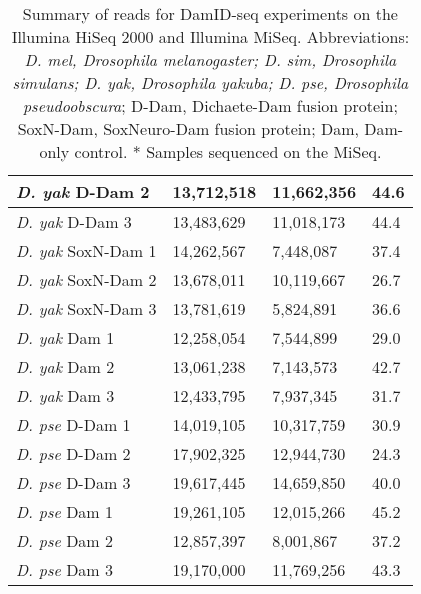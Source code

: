 \begin{table}[!h]
\begin{tabular}{|l|l|l|l|}
\emph{D. yak} D-Dam 2     & 13,712,518  & 11,662,356   & 44.6               \\ \hline
\emph{D. yak} D-Dam 3     & 13,483,629  & 11,018,173   & 44.4               \\ \hline
\emph{D. yak} SoxN-Dam 1  & 14,262,567  & 7,448,087    & 37.4               \\ \hline
\emph{D. yak} SoxN-Dam 2  & 13,678,011  & 10,119,667   & 26.7               \\ \hline
\emph{D. yak} SoxN-Dam 3  & 13,781,619  & 5,824,891    & 36.6               \\ \hline
\emph{D. yak} Dam 1       & 12,258,054  & 7,544,899    & 29.0                 \\ \hline
\emph{D. yak} Dam 2       & 13,061,238  & 7,143,573    & 42.7               \\ \hline
\emph{D. yak} Dam 3       & 12,433,795  & 7,937,345    & 31.7               \\ \hline
\emph{D. pse} D-Dam 1     & 14,019,105  & 10,317,759   & 30.9               \\ \hline
\emph{D. pse} D-Dam 2     & 17,902,325  & 12,944,730   & 24.3               \\ \hline
\emph{D. pse} D-Dam 3     & 19,617,445  & 14,659,850   & 40.0                 \\ \hline
\emph{D. pse} Dam 1       & 19,261,105  & 12,015,266   & 45.2               \\ \hline
\emph{D. pse} Dam 2       & 12,857,397  & 8,001,867    & 37.2               \\ \hline
\emph{D. pse} Dam 3       & 19,170,000  & 11,769,256   & 43.3               \\ \hline
\end{tabular}
\caption{Summary of reads for DamID-seq experiments on the Illumina HiSeq 2000 and Illumina MiSeq. Abbreviations: \emph{D. mel, Drosophila melanogaster; D. sim, Drosophila simulans; D. yak, Drosophila yakuba; D. pse, Drosophila pseudoobscura}; D-Dam, Dichaete-Dam fusion protein; SoxN-Dam, SoxNeuro-Dam fusion protein; Dam, Dam-only control. * Samples sequenced on the MiSeq.}
\label{Table 4.1}
\end{table}
\hspace{0pt}\\
